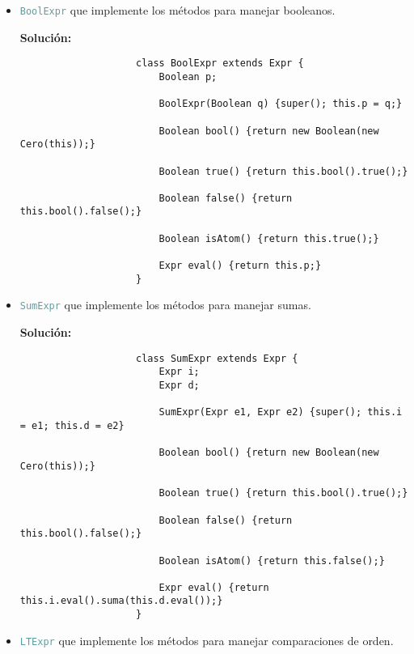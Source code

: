 \documentclass{article}
\newcommand{\tx}[1]{\textcolor{CadetBlue} {\texttt{#1}}}
\newcommand{\tb}[1]{\textcolor{RoyalPurple} {\textbf{#1}}}
\begin{document}
\begin{enumerate}
\begin{enumerate}
\begin{itemize}
                \item \tx{BoolExpr} que implemente los métodos para manejar 
                booleanos.

                \tb{Solución:}

                \begin{verbatim}
                    class BoolExpr extends Expr {
                        Boolean p;

                        BoolExpr(Boolean q) {super(); this.p = q;}

                        Boolean bool() {return new Boolean(new Cero(this));}

                        Boolean true() {return this.bool().true();}

                        Boolean false() {return this.bool().false();}

                        Boolean isAtom() {return this.true();}

                        Expr eval() {return this.p;}
                    }
                \end{verbatim}

                \item \tx{SumExpr} que implemente los métodos para manejar 
                sumas.

                \tb{Solución:}

                \begin{verbatim}
                    class SumExpr extends Expr {
                        Expr i;
                        Expr d;

                        SumExpr(Expr e1, Expr e2) {super(); this.i = e1; this.d = e2}

                        Boolean bool() {return new Boolean(new Cero(this));}

                        Boolean true() {return this.bool().true();}

                        Boolean false() {return this.bool().false();}

                        Boolean isAtom() {return this.false();}

                        Expr eval() {return this.i.eval().suma(this.d.eval());}
                    }
                \end{verbatim}

                \item \tx{LTExpr} que implemente los métodos para manejar 
                comparaciones de orden.
            \end{itemize}


\end{enumerate}
\end{enumerate}
\end{document}
